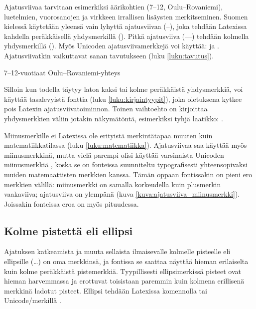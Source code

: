 Ajatusviivaa tarvitaan esimerkiksi äärikohtien (7--12,
Oulu--Rova\-niemi), luetelmien, vuorosanojen ja virkkeen irrallisen
lisäysten merkitseminen. Suomen kielessä käytetään yleensä vain lyhyttä
ajatusviivaa \mbox{(--)}, joka tehdään Latexissa kahdella peräkkäisellä
yhdysmerkillä (\koodi{--}). Pitkä ajatusviiva \mbox{(---)} tehdään
kolmella yhdysmerkillä (\koodi{---}). Myös Unicoden ajatusviivamerkkejä
voi käyttää:  ja .
Ajatusviivatkin vaikuttavat sanan tavutukseen (luku \ref{luku:tavutus}).

\begin{koodilohkosis}
  7--12-vuotiaat
  Oulu--Rovaniemi-yhteys
\end{koodilohkosis}

Silloin kun todella täytyy latoa kaksi tai kolme peräkkäistä
yhdysmerkkiä, voi käyttää tasalevyistä fonttia (luku
\ref{luku:kirjaintyypit}), joka oletuksena kytkee pois Latexin
ajatusviivatoiminnon. Toinen vaihtoehto on kirjoittaa yhdysmerkkien
väliin jotakin näkymätöntä, esimerkiksi tyhjä laatikko:
\mbox{}.

Miinusmerkille ei Latexissa ole erityistä merkintätapaa muuten kuin
matematiikkatilassa (luku \ref{luku:matematiikka}). Ajatusviivaa saa
käyttää myös miinusmerkkinä, mutta vielä parempi olisi käyttää
varsinaista Unicoden miinusmerkkiä , koska se
on fonteissa suunniteltu typografisesti yhteensopivaksi muiden
matemaattisten merkkien kanssa. Tämän oppaan fontissakin on pieni ero
merkkien välillä: miinusmerkki on samalla korkeudella kuin plusmerkin
vaakaviiva; ajatusviiva on ylempänä (kuva
\ref{kuva:ajatusviiva_miinusmerkki}). Joissakin fonteissa eroa on myös
pituudessa.


\subsection{Kolme pistettä eli ellipsi}

Ajatuksen katkeamista ja muuta sellaista ilmaisevalle kolmelle pisteelle
eli ellipsille (…) on oma merkkinsä, ja fontissa se saattaa näyttää
hieman erilaiselta kuin kolme peräkkäistä pistemerkkiä. Tyypillisesti
ellipsimerkissä pisteet ovat hieman harvemmassa ja erottuvat toisistaan
paremmin kuin kolmena erillisenä merkkinä ladotut pisteet. Ellipsi
tehdään Latexissa komennolla  tai Unicode\-/merkillä
.

